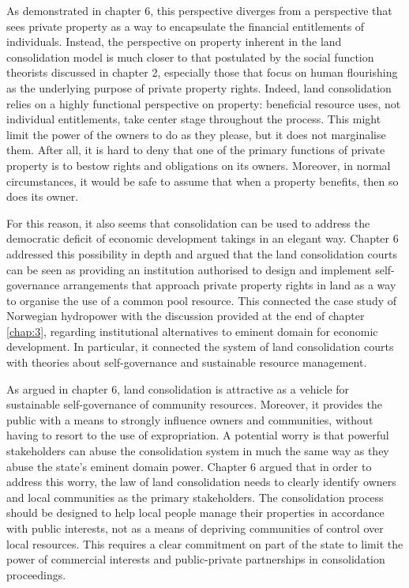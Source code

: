 As demonstrated in chapter 6, this perspective diverges from a perspective that sees private property as a way to encapsulate the financial entitlements of individuals. Instead, the perspective on property inherent in the land consolidation model is much closer to that postulated by the social function theorists discussed in chapter 2, especially those that focus on human flourishing as the underlying purpose of private property rights. Indeed, land consolidation relies on a highly functional perspective on property: beneficial resource uses, not individual entitlements, take center stage throughout the process. This might limit the power of the owners to do as they please, but it does not marginalise them. After all, it is hard to deny that one of the primary functions of private property is to bestow rights and obligations on its owners. Moreover, in normal circumstances, it would be safe to assume that when a property benefits, then so does its owner.

For this reason, it also seems that consolidation can be used to address the democratic deficit of economic development takings in an elegant way. Chapter 6 addressed this possibility in depth and argued that the land consolidation courts can be seen as providing an institution authorised to design and implement self-governance arrangements that approach private property rights in land as a way to organise the use of a common pool resource. This connected the case study of Norwegian hydropower with the discussion provided at the end of chapter \ref{chap:3}, regarding institutional alternatives to eminent domain for economic development. In particular, it connected the system of land consolidation courts with theories about self-governance and sustainable resource management.

As argued in chapter 6, land consolidation is attractive as a vehicle for sustainable self-governance of community resources. Moreover, it provides the public with a means to strongly influence owners and communities, without having to resort to the use of expropriation. A potential worry is that powerful stakeholders can abuse the consolidation system in much the same way as they abuse the state's eminent domain power. Chapter 6 argued that in order to address this worry, the law of land consolidation needs to clearly identify owners and local communities as the primary stakeholders. The consolidation process should be designed to help local people manage their properties in accordance with public interests, not as a means of depriving communities of control over local resources. This requires a clear commitment on part of the state to limit the power of commercial interests and public-private partnerships in consolidation proceedings.

